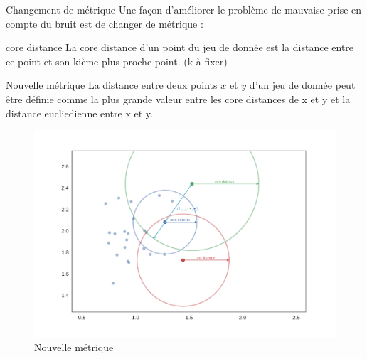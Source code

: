 \begin{frame}{Changement de métrique}
    Une façon d'améliorer le problème de mauvaise prise en compte du bruit est de changer de métrique :
    \begin{block}{core distance}
        La core distance d'un point du jeu de donnée est la distance entre ce point et son kième plus proche point. (k à fixer)
    \end{block}

    \begin{block}{Nouvelle métrique}
        La distance entre deux points $x$ et $y$ d'un jeu de donnée peut être définie comme la plus grande valeur entre les core distances de x et y et la distance eucliedienne entre x et y.
    \end{block}

    \begin{figure}
        \includegraphics[width=0.5\paperheight]{images/metrique.png}
        \caption{\label{fig:metrique}Nouvelle métrique}
    \end{figure}
\end{frame}

